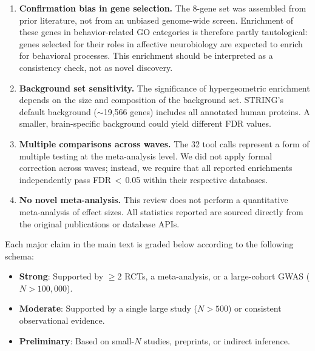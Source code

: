 \begin{enumerate}[nosep]
  \item \textbf{Confirmation bias in gene selection.}
        The 8-gene set was assembled from prior literature, not from an
        unbiased genome-wide screen.  Enrichment of these genes in
        behavior-related GO categories is therefore partly tautological:
        genes selected for their roles in affective neurobiology are expected
        to enrich for behavioral processes.  This enrichment should be
        interpreted as a consistency check, not as novel discovery.
  \item \textbf{Background set sensitivity.}
        The significance of hypergeometric enrichment depends on the size
        and composition of the background set.  STRING's default background
        ($\sim$19,566 genes) includes all annotated human proteins.  A smaller,
        brain-specific background could yield different FDR values.
  \item \textbf{Multiple comparisons across waves.}
        The 32 tool calls represent a form of multiple testing at the
        meta-analysis level.  We did not apply formal correction across
        waves; instead, we require that all reported enrichments independently
        pass FDR\,$<$\,0.05 within their respective databases.
  \item \textbf{No novel meta-analysis.}
        This review does not perform a quantitative meta-analysis of effect
        sizes.  All statistics reported are sourced directly from the
        original publications or database APIs.
\end{enumerate}


Each major claim in the main text is graded below according to the following
schema:

\begin{itemize}[nosep]
  \item \textbf{Strong}: Supported by $\geq$2 RCTs, a meta-analysis, or a
        large-cohort GWAS ($N > 100{,}000$).
  \item \textbf{Moderate}: Supported by a single large study ($N > 500$)
        or consistent observational evidence.
  \item \textbf{Preliminary}: Based on small-$N$ studies, preprints, or
        indirect inference.
\end{itemize}

